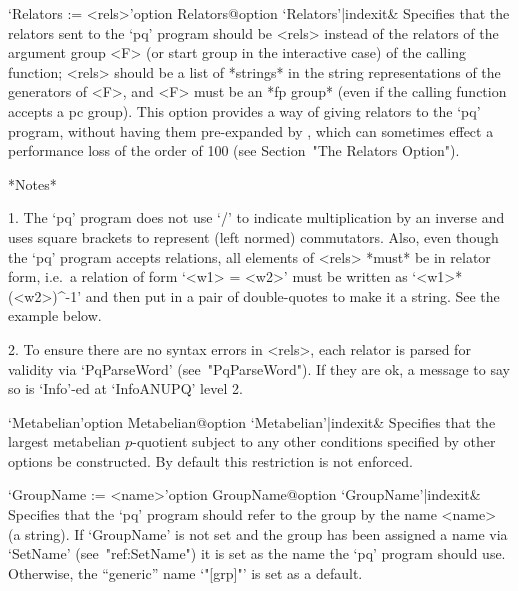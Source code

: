 \>`Relators := <rels>'{option Relators}@{option `Relators'|indexit}&
Specifies that the relators sent to the `pq'  program  should  be  <rels>
instead of the relators of the argument group <F> (or start group in  the
interactive case) of the calling function; <rels> should  be  a  list  of
*strings* in the string representations of the generators of <F>, and <F>
must be an *fp group* (even if the calling function accepts a pc  group).
This option provides a way  of  giving  relators  to  the  `pq'  program,
without having them pre-expanded by {\GAP}, which can sometimes effect  a
performance loss of the order of 100 (see Section~"The Relators Option").

*Notes*
\beginlist%

\item{1.}
The `pq' program does not  use  `/'  to  indicate  multiplication  by  an
inverse and uses square brackets to represent (left normed)  commutators.
Also, even though the `pq' program accepts  relations,  all  elements  of
<rels> *must* be in relator form, i.e.~a relation of form `<w1>  =  <w2>'
must  be  written  as  `<w1>*(<w2>)^-1'  and  then  put  in  a  pair   of
double-quotes to make it a string. See the example below.

\item{2.}
To ensure there are no syntax errors in <rels>, each  relator  is  parsed
for validity via `PqParseWord' (see~"PqParseWord"). If  they  are  ok,  a
message to say so is `Info'-ed at `InfoANUPQ' level 2.

\endlist

\>`Metabelian'{option Metabelian}@{option `Metabelian'|indexit}&
Specifies that the largest metabelian $p$-quotient subject to  any  other
conditions specified by other options be  constructed.  By  default  this
restriction is not enforced.

\>`GroupName := <name>'{option GroupName}@{option `GroupName'|indexit}&
Specifies that the `pq' program should refer to the  group  by  the  name
<name> (a string). If `GroupName' is not  set  and  the  group  has  been
assigned a name via `SetName' (see~"ref:SetName") it is set as  the  name
the `pq' program should use. Otherwise, the ``generic''  name  `"[grp]"'
is set as a default.

